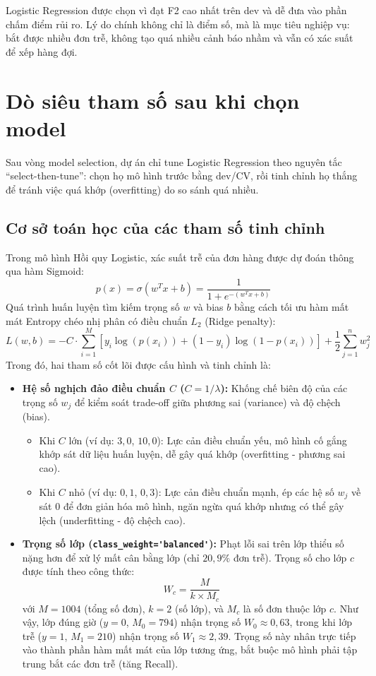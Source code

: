 \documentclass[12pt,a4paper,oneside]{report}
\newcommand{\code}[1]{\nolinkurl{#1}}
\begin{document}
Logistic Regression được chọn vì đạt F2 cao nhất trên dev và dễ đưa vào phần
chấm điểm rủi ro. Lý do chính không chỉ là điểm số, mà là mục tiêu nghiệp vụ:
bắt được nhiều đơn trễ, không tạo quá nhiều cảnh báo nhầm và vẫn có xác suất để
xếp hàng đợi.

\section{Dò siêu tham số sau khi chọn model}

Sau vòng model selection, dự án chỉ tune Logistic Regression theo nguyên tắc ``select-then-tune'': chọn họ mô hình trước bằng dev/CV, rồi tinh chỉnh họ thắng để tránh việc quá khớp (overfitting) do so sánh quá nhiều. 

\subsection{Cơ sở toán học của các tham số tinh chỉnh}

Trong mô hình Hồi quy Logistic, xác suất trễ của đơn hàng được dự đoán thông qua hàm Sigmoid:
\[
p(x) = \sigma(w^T x + b) = \frac{1}{1 + e^{-(w^T x + b)}}
\]
Quá trình huấn luyện tìm kiếm trọng số $w$ và bias $b$ bằng cách tối ưu hàm mất mát Entropy chéo nhị phân có điều chuẩn $L_2$ (Ridge penalty):
\[
L(w, b) = - C \cdot \sum_{i=1}^M \left[ y_i \log(p(x_i)) + (1 - y_i) \log(1 - p(x_i)) \right] + \frac{1}{2} \sum_{j=1}^n w_j^2
\]
Trong đó, hai tham số cốt lõi được cấu hình và tinh chỉnh là:
\begin{itemize}
    \item \textbf{Hệ số nghịch đảo điều chuẩn $C$ ($C = 1/\lambda$):} Khống chế biên độ của các trọng số $w_j$ để kiểm soát trade-off giữa phương sai (variance) và độ chệch (bias).
    \begin{itemize}
        \item Khi $C$ lớn (ví dụ: $3{,}0$, $10{,}0$): Lực cản điều chuẩn yếu, mô hình cố gắng khớp sát dữ liệu huấn luyện, dễ gây quá khớp (overfitting - phương sai cao).
        \item Khi $C$ nhỏ (ví dụ: $0{,}1$, $0{,}3$): Lực cản điều chuẩn mạnh, ép các hệ số $w_j$ về sát 0 để đơn giản hóa mô hình, ngăn ngừa quá khớp nhưng có thể gây lệch (underfitting - độ chệch cao).
    \end{itemize}
    \item \textbf{Trọng số lớp (\code{class\_weight='balanced'}):} Phạt lỗi sai trên lớp thiểu số nặng hơn để xử lý mất cân bằng lớp (chỉ $20{,}9\%$ đơn trễ). Trọng số cho lớp $c$ được tính theo công thức:
    \[
    W_c = \frac{M}{k \times M_c}
    \]
    với $M=1004$ (tổng số đơn), $k=2$ (số lớp), và $M_c$ là số đơn thuộc lớp $c$. Như vậy, lớp đúng giờ ($y=0$, $M_0=794$) nhận trọng số $W_0 \approx 0{,}63$, trong khi lớp trễ ($y=1$, $M_1=210$) nhận trọng số $W_1 \approx 2{,}39$. Trọng số này nhân trực tiếp vào thành phần hàm mất mát của lớp tương ứng, bắt buộc mô hình phải tập trung bắt các đơn trễ (tăng Recall).
\end{itemize}
\end{document}
